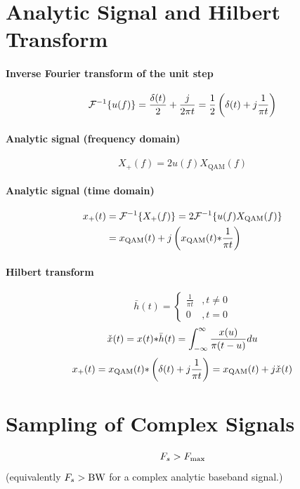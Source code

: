 \section*{Analytic Signal and Hilbert Transform}

\paragraph{Inverse Fourier transform of the unit step}
\[
{\cal F}^{-1}\{u(f)\} = \frac{\delta(t)}{2} + \frac{j}{2 \pi t} = \frac{1}{2} \left( \delta(t) + j \frac{1}{\pi t} \right)
\]

\paragraph{Analytic signal (frequency domain)}
\begin{equation}
X_{+}(f) = 2 u(f) X_{\textrm{QAM}}(f)
\label{eq:qamAnalytic}
\end{equation}

\paragraph{Analytic signal (time domain)}
\begin{align}
x_{+}(t) & = {\cal F}^{-1} \{ X_{+}(f) \} = 2 {\cal F}^{-1} \{u(f) X_{\textrm{QAM}}(f) \} \\
  & = x_{\textrm{QAM}}(t) + j \left( x_{\textrm{QAM}}(t) {\ast} \frac{1}{\pi t} \right)
\end{align}

\paragraph{Hilbert transform}
\[
\bar h(t) = \left\{ {\begin{array}{cc} {\frac 1 {\pi t}} & {, t \ne 0}\\ 0 & {, t=0} \end{array}  } \right.
\]
\[
\check{x}(t) = x(t) {\ast} \bar h(t) = \int_{- \infty}^\infty \frac{x(u)}{\pi (t - u)} du
\]
\[
x_{+}(t) = x_{\textrm{QAM}}(t) {\ast} \left(\delta(t) + j \frac 1 {\pi t} \right) = x_{\textrm{QAM}}(t) + j \check x(t)
\]

\section*{Sampling of Complex Signals}
\begin{equation}
{F_s} > F_{{\textrm{max}}}
\label{eq:samplingTheoremComplexSignalsRepeated}
\end{equation}
(equivalently ${F_s} > {\textrm{BW}}$ for a complex analytic baseband signal.)

